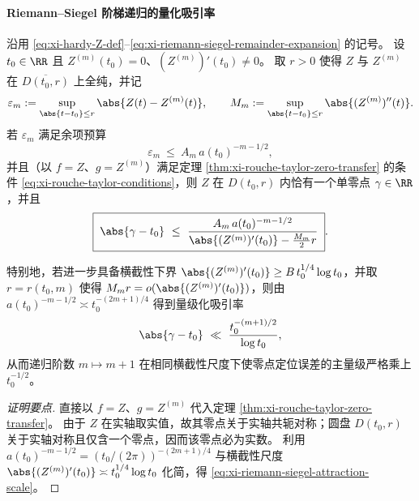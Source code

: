 \paragraph{Riemann--Siegel 阶梯递归的量化吸引率}
\begin{corollary}\label{cor:xi-riemann-siegel-attraction-rate}
沿用 \eqref{eq:xi-hardy-Z-def}--\eqref{eq:xi-riemann-siegel-remainder-expansion} 的记号。
设 \(t_0\in\RR\) 且 \(Z^{(m)}(t_0)=0\)、\((Z^{(m)})'(t_0)\neq 0\)。
取 \(r>0\) 使得 \(Z\) 与 \(Z^{(m)}\) 在 \(\overline{D(t_0,r)}\) 上全纯，并记
\[
\varepsilon_m:=\sup_{\abs{t-t_0}\le r}\abs{Z(t)-Z^{(m)}(t)},
\qquad
M_m:=\sup_{\abs{t-t_0}\le r}\abs{(Z^{(m)})''(t)}.
\]
若 \(\varepsilon_m\) 满足余项预算
\begin{equation}\label{eq:xi-riemann-siegel-uniform-remainder-budget}
\varepsilon_m\ \le\ A_m\,a(t_0)^{-m-1/2},
\end{equation}
并且（以 \(f=Z\)、\(g=Z^{(m)}\)）满足定理 \ref{thm:xi-rouche-taylor-zero-transfer} 的条件 \eqref{eq:xi-rouche-taylor-conditions}，则 \(Z\) 在 \(D(t_0,r)\) 内恰有一个单零点 \(\gamma\in\RR\)，并且
\begin{equation}\label{eq:xi-riemann-siegel-zero-drift-budget}
\boxed{\;
\abs{\gamma-t_0}
\ \le\
\frac{A_m\,a(t_0)^{-m-1/2}}{\abs{(Z^{(m)})'(t_0)}-\tfrac{M_m}{2}r}\; }.
\end{equation}
\par
特别地，若进一步具备横截性下界 \(\abs{(Z^{(m)})'(t_0)}\ge B\,t_0^{1/4}\log t_0\)，并取 \(r=r(t_0,m)\) 使得 \(M_m r=o(\abs{(Z^{(m)})'(t_0)})\)，则由 \(a(t_0)^{-m-1/2}\asymp t_0^{-(2m+1)/4}\) 得到量级化吸引率
\begin{equation}\label{eq:xi-riemann-siegel-attraction-scale}
\abs{\gamma-t_0}\ \ll\ \frac{t_0^{-(m+1)/2}}{\log t_0},
\end{equation}
从而递归阶数 \(m\mapsto m+1\) 在相同横截性尺度下使零点定位误差的主量级严格乘上 \(t_0^{-1/2}\)。
\end{corollary}
\begin{proof}[证明要点]
直接以 \(f=Z\)、\(g=Z^{(m)}\) 代入定理 \ref{thm:xi-rouche-taylor-zero-transfer}。
由于 \(Z\) 在实轴取实值，故其零点关于实轴共轭对称；圆盘 \(D(t_0,r)\) 关于实轴对称且仅含一个零点，因而该零点必为实数。
利用 \(a(t_0)^{-m-1/2}=(t_0/(2\pi))^{-(2m+1)/4}\) 与横截性尺度 \(\abs{(Z^{(m)})'(t_0)}\asymp t_0^{1/4}\log t_0\) 化简，得 \eqref{eq:xi-riemann-siegel-attraction-scale}。
\end{proof}

